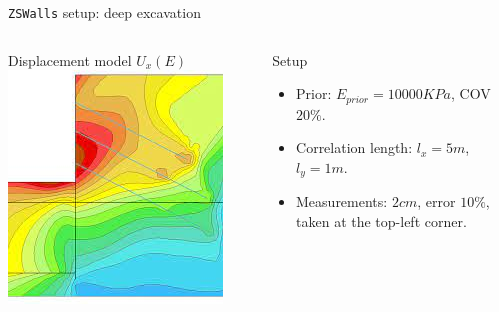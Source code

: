 \documentclass[dvipsnames]{beamer}
\begin{document}
	\begin{frame}{\texttt{ZSWalls} setup: deep excavation}
	\begin{columns}
	\begin{column}{.5\textwidth}
	\begin{block}{Displacement model $U_x(E)$}
	\includegraphics[width=\textwidth]{images/settlement.jpg}
	\end{block}
	\end{column}
	\begin{column}{.5\textwidth}
	\begin{block}{Setup}
	\begin{itemize}
	\item Prior: $E_{prior} = 10000 \si{KPa}$, COV $20\%$.
	\item Correlation length: $l_x = 5\si{m}$, $l_y = 1\si{m}$.
	\item Measurements: $2 \si{cm}$, error $10\%$, taken at the top-left corner.
	\end{itemize}
	\end{block}
	\end{column}
	\end{columns}
	\end{frame}
	
\end{document}

